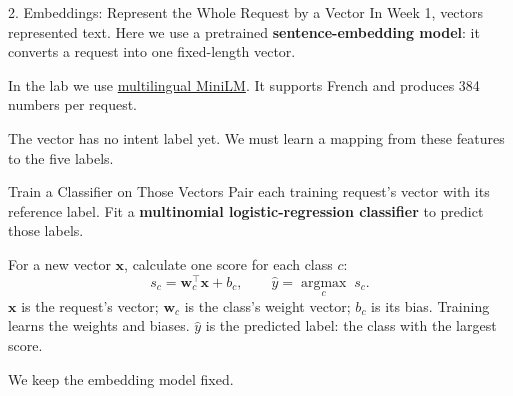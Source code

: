\documentclass[aspectratio=169]{beamer}
\begin{document}
\begin{frame}{2. Embeddings: Represent the Whole Request by a Vector}
  \small In Week 1, vectors represented text. Here we use a pretrained \textbf{sentence-embedding model}: it converts a request into one fixed-length vector.
  \begin{center}
  \end{center}
  \small In the lab we use \href{https://huggingface.co/sentence-transformers/paraphrase-multilingual-MiniLM-L12-v2}{multilingual MiniLM}. It supports French and produces 384 numbers per request.
  \par\vspace{0.6em}
  The vector has no intent label yet. We must learn a mapping from these features to the five labels.
\end{frame}

\begin{frame}{Train a Classifier on Those Vectors}
  \small Pair each training request's vector with its reference label. Fit a \textbf{multinomial logistic-regression classifier} to predict those labels.
  \par\vspace{0.4em}
  For a new vector $\mathbf{x}$, calculate one score for each class $c$:
  \[
    s_c = \mathbf{w}_c^\top\mathbf{x}+b_c,
    \qquad \widehat{y}=\underset{c}{\operatorname{argmax}}\;s_c.
  \]
  \small $\mathbf{x}$ is the request's vector; $\mathbf{w}_c$ is the class's weight vector; $b_c$ is its bias. Training learns the weights and biases. $\widehat{y}$ is the predicted label: the class with the largest score.
  \begin{center}
  \end{center}
  \small We keep the embedding model fixed.
\end{frame}
\end{document}
